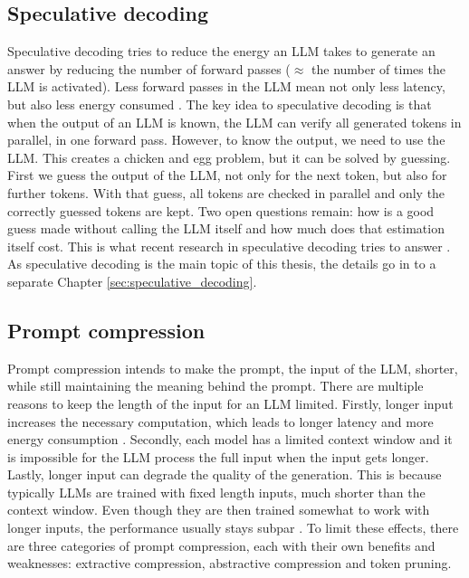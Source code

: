 \subsection{Speculative decoding}
Speculative decoding tries to reduce the energy an LLM takes to generate an answer by reducing the number of forward passes ($\approx$ the number of times the LLM is activated). Less forward passes in the LLM mean not only less latency, but also less energy consumed \cite{qin2024optimized}. The key idea to speculative decoding is that when the output of an LLM is known, the LLM can verify all generated tokens in parallel, in one forward pass. However, to know the output, we need to use the LLM. This creates a chicken and egg problem, but it can be solved by guessing. First we guess the output of the LLM, not only for the next token, but also for further tokens. With that guess, all tokens are checked in parallel and only the correctly guessed tokens are kept. Two open questions remain: how is a good guess made without calling the LLM itself and how much does that estimation itself cost. This is what recent research in speculative decoding tries to answer \cite{he2023rest, li2024eagle}. As speculative decoding is the main topic of this thesis, the details go in to a separate Chapter \ref{sec:speculative_decoding}.

\subsection{Prompt compression}
Prompt compression intends to make the prompt, the input of the LLM, shorter, while still maintaining the meaning behind the prompt. There are multiple reasons to keep the length of the input for an LLM limited. Firstly, longer input increases the necessary computation, which leads to longer latency and more energy consumption \cite{kim2023arithmeticintensityllm}. Secondly, each model has a limited context window and it is impossible for the LLM process the full input when the input gets longer. Lastly, longer input can degrade the quality of the generation. This is because typically LLMs are trained with fixed length inputs, much shorter than the context window. Even though they are then trained somewhat to work with longer inputs, the performance usually stays subpar \cite{levy2024sameinputlength, liu2024lost}. To limit these effects, there are three categories of prompt compression, each with their own benefits and weaknesses: extractive compression, abstractive compression and token pruning.

